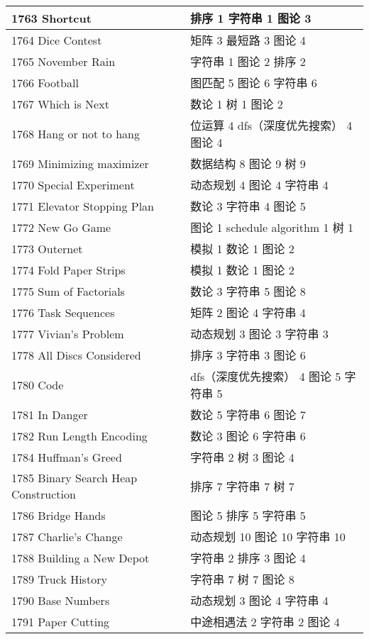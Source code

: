 \begin{longtable}{| p{} | p{} |}
 1763 Shortcut  & 排序 1 字符串 1 图论 3 \\ \hline
 1764 Dice Contest  & 矩阵 3 最短路 3 图论 4 \\ \hline
 1765 November Rain  & 字符串 1 图论 2 排序 2 \\ \hline
 1766 Football  & 图匹配 5 图论 6 字符串 6 \\ \hline
 1767 Which is Next  & 数论 1 树 1 图论 2 \\ \hline
 1768 Hang or not to hang  & 位运算 4 dfs（深度优先搜索） 4 图论 4 \\ \hline
 1769 Minimizing maximizer  & 数据结构 8 图论 9 树 9 \\ \hline
 1770 Special Experiment  & 动态规划 4 图论 4 字符串 4 \\ \hline
 1771 Elevator Stopping Plan  & 数论 3 字符串 4 图论 5 \\ \hline
 1772 New Go Game  & 图论 1 schedule algorithm 1 树 1 \\ \hline
 1773 Outernet  & 模拟 1 数论 1 图论 2 \\ \hline
 1774 Fold Paper Strips  & 模拟 1 数论 1 图论 2 \\ \hline
 1775 Sum of Factorials  & 数论 3 字符串 5 图论 8 \\ \hline
 1776 Task Sequences  & 矩阵 2 图论 4 字符串 4 \\ \hline
 1777 Vivian's Problem  & 动态规划 3 图论 3 字符串 3 \\ \hline
 1778 All Discs Considered  & 排序 3 字符串 3 图论 6 \\ \hline
 1780 Code  & dfs（深度优先搜索） 4 图论 5 字符串 5 \\ \hline
 1781 In Danger  & 数论 5 字符串 6 图论 7 \\ \hline
 1782 Run Length Encoding  & 数论 3 图论 6 字符串 6 \\ \hline
 1784 Huffman's Greed  & 字符串 2 树 3 图论 4 \\ \hline
 1785 Binary Search Heap Construction  & 排序 7 字符串 7 树 7 \\ \hline
 1786 Bridge Hands  & 图论 5 排序 5 字符串 5 \\ \hline
 1787 Charlie's Change  & 动态规划 10 图论 10 字符串 10 \\ \hline
 1788 Building a New Depot  & 字符串 2 排序 3 图论 4 \\ \hline
 1789 Truck History  & 字符串 7 树 7 图论 8 \\ \hline
 1790 Base Numbers  & 动态规划 3 图论 4 字符串 4 \\ \hline
 1791 Paper Cutting  & 中途相遇法 2 字符串 2 图论 4 \\ \hline

\end{longtable}
